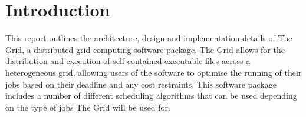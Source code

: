 \chapter{Introduction}
This report outlines the architecture, design and implementation details of The Grid, a distributed grid computing software package. The Grid allows for the distribution and execution of self-contained executable files across a heterogeneous grid, allowing users of the software to optimise the running of their jobs based on their deadline and any cost restraints. This software package includes a number of different scheduling algorithms that can be used depending on the type of jobs The Grid will be used for.

